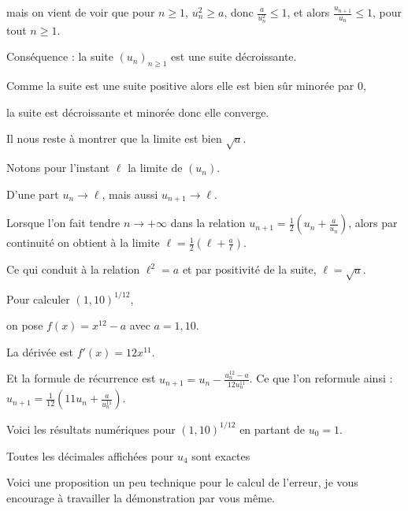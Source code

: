mais on vient de voir que pour $n\ge 1$,  $u_n^2 \ge a$,
donc $\frac{a}{u_n^2}\le 1$, et alors $\frac{u_{n+1}}{u_n} \le 1$, pour tout $n\ge 1$.
  
  Conséquence : la suite $(u_n)_{n\ge1}$ est une suite décroissante.
  
  Comme la suite est une suite positive alors elle est bien sûr minorée par $0$,
  
  la suite est décroissante et minorée donc elle converge.
  
  \change
  
Il nous reste à montrer que la limite est bien  $\sqrt{a}$.


  
  Notons pour l'instant $\ell$ la limite de $(u_n)$. 
  
  D'une part $u_n \to \ell$, mais aussi $u_{n+1} \to \ell$.
  
  
  Lorsque l'on fait tendre $n\to +\infty$ dans la relation $u_{n+1} = \frac12 \left(u_n+\frac{a}{u_n}\right)$, 
  alors par continuité on obtient à la limite 
  $\ell = \frac12 \left(\ell+\frac{a}{\ell}\right)$. 
  
  Ce qui conduit à la relation $\ell^2=a$ et par positivité de la suite, $\ell = \sqrt{a}$.  


\diapo

Pour calculer $(1,10)^{1/12}$, 

\change

on pose $f(x)=x^{12}-a$ avec $a=1,10$. 


\change

La dérivée est $f'(x)=12x^{11}$. 

\change

Et la formule de récurrence est  $u_{n+1} = u_n - \frac{u_n^{12}-a}{12u_n^{11}}$. 
Ce que l'on reformule ainsi :
$ u_{n+1} = \frac1{12} \left(11u_n+\frac{a}{u_n^{11}}\right)$.

\change



Voici les résultats numériques pour $(1,10)^{1/12}$ en partant de $u_0=1$.


Toutes les décimales affichées pour $u_4$ sont exactes

\diapo

Voici une proposition un peu technique pour le calcul de l'erreur, 
je vous encourage à travailler la démonstration par vous même.

